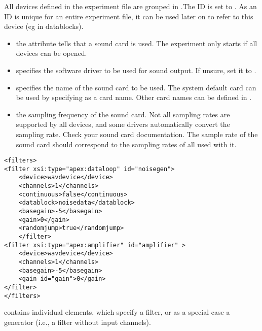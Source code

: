 All devices defined in the experiment file are grouped in
.The ID is set to . As an ID is
unique for an entire experiment file, it can be used later on to
refer to this device (eg in datablocks).

\begin{itemize}
\item {} the 
attribute tells \apex that a sound card is used. The experiment
only starts if all devices can be opened.

\item {} specifies the software driver to be used
for sound output. If unsure, set it to .

\item {} specifies the name of the sound card to be
used. The system default card can be used by specifying
 as a card name. Other card names can be defined in
.

\item {} the sampling frequency of the sound
card. Not all sampling rates are supported by all devices, and
some drivers automatically convert the sampling rate. Check your
sound card documentation. The sample rate of the sound card should
correspond to the sampling rates of all  used
with it.
\end{itemize}

   
 

\begin{lstlisting}
<filters>
<filter xsi:type="apex:dataloop" id="noisegen">
    <device>wavdevice</device>
    <channels>1</channels>
    <continuous>false</continuous>
    <datablock>noisedata</datablock>
    <basegain>-5</basegain>
    <gain>0</gain>
    <randomjump>true</randomjump>
    </filter>
<filter xsi:type="apex:amplifier" id="amplifier" >
    <device>wavdevice</device>
    <channels>1</channels>
    <basegain>-5</basegain>
    <gain id="gain">0</gain>
</filter>
</filters>
\end{lstlisting}

 contains individual  elements,
which specify a filter, or as a special case a generator (i.e., a
filter without input channels).

